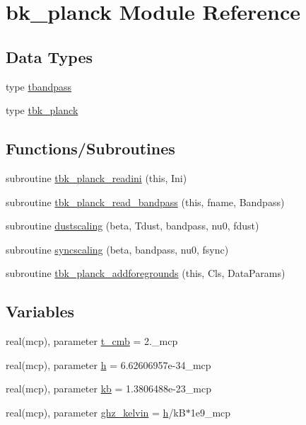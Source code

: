 \hypertarget{namespacebk__planck}{}\section{bk\+\_\+planck Module Reference}
\label{namespacebk__planck}
\subsection*{Data Types}
\begin{DoxyCompactItemize}
\item 
type \mbox{\hyperlink{structbk__planck_1_1tbandpass}{tbandpass}}
\item 
type \mbox{\hyperlink{structbk__planck_1_1tbk__planck}{tbk\+\_\+planck}}
\end{DoxyCompactItemize}
\subsection*{Functions/\+Subroutines}
\begin{DoxyCompactItemize}
\item 
subroutine \mbox{\hyperlink{namespacebk__planck_a854764740d5b45a861a35309dcc7ab96}{tbk\+\_\+planck\+\_\+readini}} (this, Ini)
\item 
subroutine \mbox{\hyperlink{namespacebk__planck_a073f30d6055fdd0e28e842201c1e9fdf}{tbk\+\_\+planck\+\_\+read\+\_\+bandpass}} (this, fname, Bandpass)
\item 
subroutine \mbox{\hyperlink{namespacebk__planck_a532e314297951fce385bff0bc57f81c3}{dustscaling}} (beta, Tdust, bandpass, nu0, fdust)
\item 
subroutine \mbox{\hyperlink{namespacebk__planck_ae4ec8dfb07864a47b4f431f0be309608}{syncscaling}} (beta, bandpass, nu0, fsync)
\item 
subroutine \mbox{\hyperlink{namespacebk__planck_af94e4192bd2f4c8746e6e1108e87a0f0}{tbk\+\_\+planck\+\_\+addforegrounds}} (this, Cls, Data\+Params)
\end{DoxyCompactItemize}
\subsection*{Variables}
\begin{DoxyCompactItemize}
\item 
real(mcp), parameter \mbox{\hyperlink{namespacebk__planck_aed63f60182fa590d070ff874aff39d1e}{t\+\_\+cmb}} = 2.\+\_\+mcp
\item 
real(mcp), parameter \mbox{\hyperlink{namespacebk__planck_a2be53d116cb947e12107471bd0b14abd}{h}} = 6.\+62606957e-\/34\+\_\+mcp
\item 
real(mcp), parameter \mbox{\hyperlink{namespacebk__planck_a92bf968defaa02497d39c2f228710c04}{kb}} = 1.\+3806488e-\/23\+\_\+mcp
\item 
real(mcp), parameter \mbox{\hyperlink{namespacebk__planck_a3b81f62eff019d7f94b2a4ca37efdf91}{ghz\+\_\+kelvin}} = \mbox{\hyperlink{namespacebk__planck_a2be53d116cb947e12107471bd0b14abd}{h}}/kB$\ast$1e9\+\_\+mcp
\end{DoxyCompactItemize}


